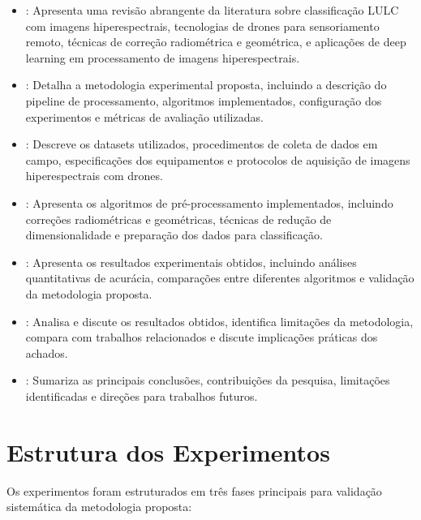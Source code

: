 \begin{itemize}
    \item \textbf{}: Apresenta uma revisão abrangente da literatura sobre classificação LULC com imagens hiperespectrais, tecnologias de drones para sensoriamento remoto, técnicas de correção radiométrica e geométrica, e aplicações de deep learning em processamento de imagens hiperespectrais.
    
    \item \textbf{}: Detalha a metodologia experimental proposta, incluindo a descrição do pipeline de processamento, algoritmos implementados, configuração dos experimentos e métricas de avaliação utilizadas.
    
    \item \textbf{}: Descreve os datasets utilizados, procedimentos de coleta de dados em campo, especificações dos equipamentos e protocolos de aquisição de imagens hiperespectrais com drones.
    
    \item \textbf{}: Apresenta os algoritmos de pré-processamento implementados, incluindo correções radiométricas e geométricas, técnicas de redução de dimensionalidade e preparação dos dados para classificação.
    
    \item \textbf{}: Apresenta os resultados experimentais obtidos, incluindo análises quantitativas de acurácia, comparações entre diferentes algoritmos e validação da metodologia proposta.
    
    \item \textbf{}: Analisa e discute os resultados obtidos, identifica limitações da metodologia, compara com trabalhos relacionados e discute implicações práticas dos achados.
    
    \item \textbf{}: Sumariza as principais conclusões, contribuições da pesquisa, limitações identificadas e direções para trabalhos futuros.
\end{itemize}

\section{Estrutura dos Experimentos}\label{sec:estrutura_experimentos}

Os experimentos foram estruturados em três fases principais para validação sistemática da metodologia proposta:

